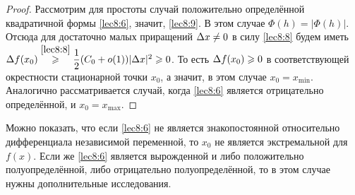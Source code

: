 \documentclass[../../main.tex]{subfiles}
\begin{document}
\begin{proof}
        Рассмотрим для простоты случай положительно определённой квадратичной
        формы \eqref{lec8:6}, значит, \eqref{lec8:9}. В этом случае $\Phi(h) =
        |\Phi(h)|$. Отсюда для достаточно малых
        приращений $\Delta x \ne 0$ в силу \eqref{lec8:8} будем иметь $\Delta f(x_0)
        \stackrel{\eqref{lec8:8}}{\geqslant} \dfrac12 (C_0 + o(1)) |\Delta x|^2 \geqslant 0$.
        То есть $\Delta f(x_0) \geqslant 0$ в соответствующей окрестности стационарной
        точки $x_0$, а значит, в этом случае $x_0 = x_{\min}$. Аналогично
        рассматривается случай, когда \eqref{lec8:6} является отрицательно
        определённой, и $x_0 = x_{\max}$.
    \end{proof}
    \begin{rem}
        Можно показать, что если \eqref{lec8:6} не является знакопостоянной
        относительно дифференциала независимой переменной, то $x_0$ не
        является экстремальной для $f(x)$. Если же \eqref{lec8:6} является
        вырожденной и либо положительно полуопределённой, либо отрицательно
        полуопределённой, то в этом случае нужны дополнительные исследования.
    \end{rem}
    
\end{document}
